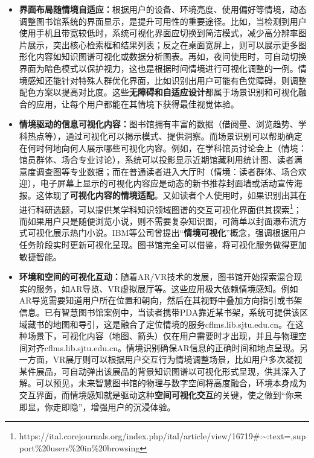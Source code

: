 \documentclass[
  letterpaper,
]{scrbook}
\begin{document}
\begin{itemize}
\item
  \textbf{界面布局随情境自适应：}根据用户的设备、环境亮度、使用偏好等情境，动态调整图书馆系统的界面显示，是提升可用性的重要途径。比如，当检测到用户使用手机且带宽较低时，系统可视化界面应切换到简洁模式，减少高分辨率图片展示，突出核心检索框和结果列表；反之在桌面宽屏上，则可以展示更多图形化内容如知识图谱可视化或数据分析图表。再如，夜间使用时，可自动切换界面为暗色模式以保护视力，这也是根据时间情境进行可视化调整的一例。情境感知还能针对特殊人群优化界面，比如识别出用户可能有色觉障碍，则调整配色方案以提高对比度。这些\textbf{无障碍和自适应设计}都属于场景识别和可视化融合的应用，让每个用户都能在其情境下获得最佳视觉体验。
\item
  \textbf{情境驱动的信息可视化内容：}图书馆拥有丰富的数据（借阅量、浏览趋势、学科热点等），通过可视化可以揭示模式、提供洞察。而场景识别可以帮助确定在何时何地向何人展示哪些可视化内容。例如，在学科馆员讨论会上（情境：馆员群体、场合专业讨论），系统可以投影显示近期馆藏利用统计图、读者满意度调查图等专业数据；而在普通读者进入大厅时（情境：读者群体、场合欢迎），电子屏幕上显示的可视化内容应是动态的新书推荐封面墙或活动宣传海报。这体现了\textbf{可视化内容的情境适配}。又如读者个人使用时，如果识别出其在进行科研选题，可以提供某学科知识领域图谱的交互可视化界面供其探索\footnote{https://ital.corejournals.org/index.php/ital/article/view/16719\#:\textasciitilde:text=,support\%20users\%20in\%20browsing}；而如果用户只是随便浏览小说，则不需要复杂知识图，可简单以封面瀑布流方式可视化展示热门小说。IBM等公司曾提出``\textbf{情境可视化}''概念，强调根据用户任务阶段实时更新可视化呈现。图书馆完全可以借鉴，将可视化服务做得更加敏捷智能。
\item
  \textbf{环境和空间的可视化互动：}随着AR/VR技术的发展，图书馆开始探索混合现实的服务，如AR导览、VR虚拟展厅等。这些应用极大依赖情境感知。例如AR导览需要知道用户所在位置和朝向，然后在其视野中叠加方向指引或书架信息。已有智慧图书馆案例中，当读者携带PDA靠近某书架，系统可提供该区域藏书的地图和导引，这是融合了定位情境的服务cflms.lib.sjtu.edu.cn。在这种场景下，可视化内容（地图、箭头）仅在用户需要时才出现，并且与物理空间对齐cflms.lib.sjtu.edu.cn。情境识别确保AR信息的正确时间和地点呈现。另一方面，VR展厅则可以根据用户交互行为情境调整场景，比如用户多次凝视某件展品，可自动弹出该展品的背景知识图谱以可视化形式呈现，供其深入了解。可以预见，未来智慧图书馆的物理与数字空间将高度融合，环境本身成为交互界面，而情境感知就是驱动这种\textbf{空间可视化交互}的关键，使之做到``你来即显，你走即隐''，增强用户的沉浸体验。
\end{itemize}
\end{document}
